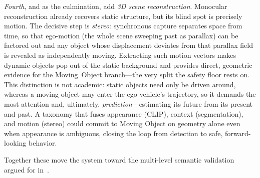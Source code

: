 \documentclass[conference]{IEEEtran}
\begin{document}
\emph{Fourth}, and as the culmination, add \emph{3D scene reconstruction}.
Monocular reconstruction already recovers static structure, but its blind spot is
precisely motion. The decisive step is \emph{stereo}: synchronous capture
separates space from time, so that ego-motion (the whole scene sweeping past as
parallax) can be factored out and any object whose displacement deviates from that
parallax field is revealed as independently moving. Extracting such motion vectors
makes dynamic objects pop out of the static background and provides direct,
geometric evidence for the \textsf{Moving~Object} branch---the very split the
safety floor rests on. This distinction is not academic: static objects need only
be driven around, whereas a moving object may enter the ego-vehicle's trajectory,
so it demands the most attention and, ultimately, \emph{prediction}---estimating
its future from its present and past. A taxonomy that fuses appearance (CLIP),
context (segmentation), and motion (stereo) could commit to \textsf{Moving
Object} on geometry alone even when appearance is ambiguous, closing the loop from
detection to safe, forward-looking behavior.

Together these move the system toward the multi-level semantic validation argued
for in~\cite{schaller2025}.
\end{document}

